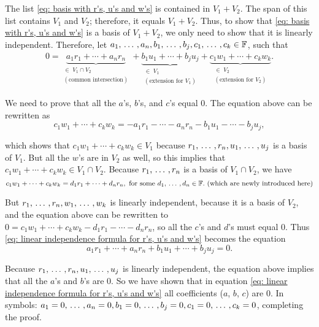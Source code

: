 \begin{prf}
The list \eqref{eq: basis with r's, u's and w's} is contained in $V_1 + V_2$. The span of this list contains $V_1$ and $V_2$; therefore, it equals $V_1 + V_2$. Thus, to show that \eqref{eq: basis with r's, u's and w's} is a basis of $V_1 + V_2$, we only need to show that it is linearly independent. Therefore, let $a_1, {\, \ldots \,\,}, a_n, b_1, {\, \ldots \,\,}, b_j, c_1, {\, \ldots \,\,}, c_k \in \mathbb{F}$, such that
\begin{equation}
  \label{eq: linear independence formula for r's, u's and w's}
  \begin{aligned}
    0 = \underbrace{a_1 r_1 + \cdots + a_n r_n}_{\substack{\in \; V_1 \cap V_2 \\ (\text{common intersection})}}
    + \underbrace{b_1 u_1 + \cdots + b_j u_j}_{\substack{\in \; V_1 \\ (\text{extension for } V_1 )}}
    + \underbrace{c_1 w_1 + \cdots + c_k w_k}_{\substack{\in \; V_2 \\ (\text{extension for } V_2 ) }}.
  \end{aligned}
\end{equation}

We need to prove that all the $a$'s, $b$'s, and $c$'s equal $0$. The equation above can be rewritten as
\begin{equation}
  c_1 w_1 + \cdots + c_k w_k = - a_1 r_1 - \cdots - a_n r_n - b_1 u_1 - \cdots - b_j u_j,
\end{equation}

which shows that $c_1 w_1 + \cdots + c_k w_k \in V_1$ because $r_1, {\, \ldots \,\,}, r_n, u_1, {\, \ldots \,\,}, u_j$ is a basis of $V_1$. But all the $w$'s are in $V_2$ as well, so this implies that $c_1 w_1 + \cdots + c_k w_k \in V_1 \cap V_2$. Because $r_1, {\, \ldots \,\,}, r_n$ is a basis of $V_1 \cap V_2$, we have
\begin{equation}
  c_1 w_1 + \cdots + c_k w_k = d_1 r_1 + \cdots + d_n r_n, \text{ for some } d_1, {\, \ldots \,\,}, d_n \in \mathbb{F}. \text{ (which are newly introduced here)}
\end{equation}

But $r_1, {\, \ldots \,\,}, r_n, w_1, {\, \ldots \,\,}, w_k$ is linearly independent, because it is a basis of $V_2$, and the equation above can be rewritten to $0 = c_1 w_1 + \cdots + c_k w_k - d_1 r_1 - \cdots - d_n r_n$, so all the $c$'s and $d$'s must equal $0$. Thus \eqref{eq: linear independence formula for r's, u's and w's} becomes the equation
\begin{equation}
  a_1 r_1 + \cdots + a_n r_n + b_1 u_1 + \cdots + b_j u_j = 0.
\end{equation}

Because $r_1, {\, \ldots \,\,}, r_n, u_1, {\, \ldots \,\,}, u_j$ is linearly independent, the equation above implies that all the $a$'s and $b$'s are $0$. So we have shown that in equation \eqref{eq: linear independence formula for r's, u's and w's} all coefficients ($a$, $b$, $c$) are $0$. In symbols: $a_1 = 0, {\, \ldots \,\,}, a_n = 0, b_1 = 0, {\, \ldots \,\,}, b_j = 0, c_1 = 0, {\, \ldots \,\,}, c_k = 0$,
completing the proof.
\end{prf}

